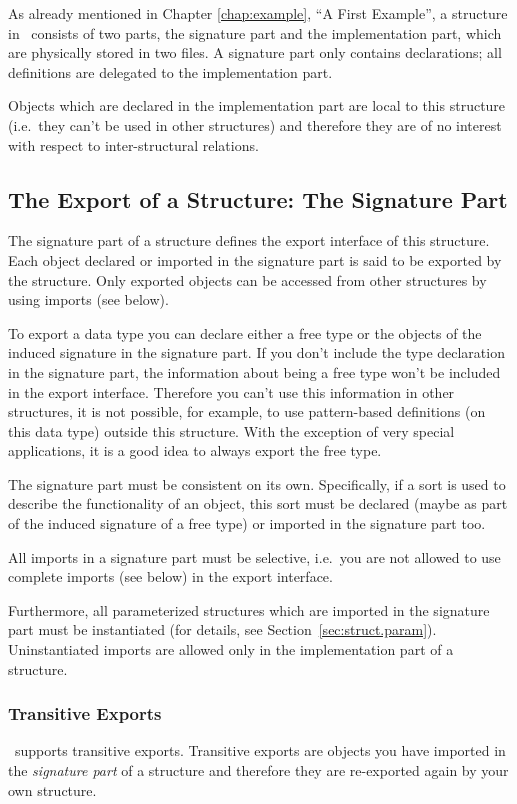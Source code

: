 \medskip
As already mentioned in Chapter \ref{chap:example}, ``A First
Example'', a structure in \opal\ consists of two parts, the signature part
and the implementation part, which are physically stored in two files.
A signature part only contains declarations; all definitions are
 delegated to the implementation part.

Objects which are declared in the implementation part are local to
this structure (i.e.~they can't be used in other structures) and
therefore they are of no interest with respect to inter-structural relations.


\subsection{The Export of a Structure: The Signature Part}
\novice
The signature part of a structure defines the export interface of this
structure. 
Each object declared or imported in the signature part is said to be
exported by the structure. 
Only exported objects can be accessed from other structures by using
imports (see below).

\advanced To export a data type you can declare either a free type or the
objects of the induced signature in the signature part. 
If you don't include the type declaration in the signature part,
the information about being a free type won't be included in the
export interface.  
Therefore you can't use this information in other structures, it
is not possible, for example,  to use pattern-based definitions (on
this data type) outside this structure.
With the exception of very special applications, it is a good idea
to  always export the free type.
\medskip

\novice The signature part must be consistent on its own.
Specifically, if a sort is used to describe the functionality of
an object, this sort must be declared (maybe as part of the induced
signature of a free type) or imported in the signature part too.

All imports in a signature part must be selective, i.e.~you are not
allowed to use complete imports (see below) in the export interface.
\medskip

\advanced Furthermore, all parameterized structures which are imported in the
signature part must be instantiated (for details, see
Section~\ref{sec:struct.param}). Uninstantiated imports are allowed
only in the implementation part of a structure.


\subsubsection{Transitive Exports}
\novice
\opal\ supports  transitive exports. Transitive exports are objects
you have imported in the {\em signature part\/} of a structure and
therefore they are re-exported again by your own structure.

